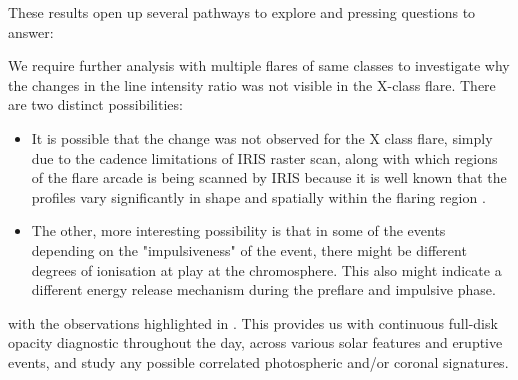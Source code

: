 These results open up several pathways to explore and pressing questions to answer:

 We require further analysis with multiple flares of same classes to investigate why the changes in the line intensity ratio was not visible in the X-class flare. There are two distinct possibilities:

    \begin{itemize}[label=]
        \item It is possible that the change was not observed for the X class flare, simply due to the cadence limitations of IRIS raster scan, along with which regions of the flare arcade is being scanned by IRIS because it is well known that the  profiles vary significantly in shape and spatially within the flaring region \citep{panos18,dalda23}.
        \item The other, more interesting possibility is that in some of the events depending on the "impulsiveness" of the event, there might be different degrees of ionisation at play at the chromosphere. This also might indicate a different energy release mechanism during the preflare and impulsive phase.
    \end{itemize}

 with the observations highlighted in \cite{roy24}. This provides us with continuous full-disk opacity diagnostic throughout the day, across various solar features and eruptive events, and study any possible correlated photospheric and/or coronal signatures.


